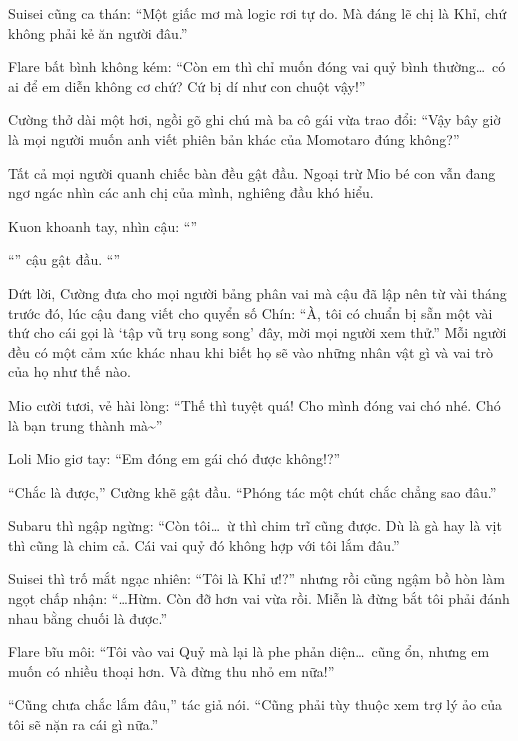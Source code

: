 \documentclass[../main.tex]{subfiles}
\begin{document}
Suisei cũng ca thán: ``Một giấc mơ mà logic rơi tự do. Mà đáng lẽ chị là Khỉ, chứ không phải kẻ ăn người đâu.''

Flare bất bình không kém: ``Còn em thì chỉ muốn đóng vai quỷ bình thường\dots\ có ai để em diễn không cơ chứ? Cứ bị dí như con chuột vậy!''

Cường thở dài một hơi, ngồi gõ ghi chú mà ba cô gái vừa trao đổi: ``Vậy bây giờ là mọi người muốn anh viết phiên bản khác của Momotaro đúng không?''

Tất cả mọi người quanh chiếc bàn đều gật đầu. Ngoại trừ Mio bé con vẫn đang ngơ ngác nhìn các anh chị của mình, nghiêng đầu khó hiểu.

Kuon khoanh tay, nhìn cậu: ``''

``'' cậu gật đầu. ``''

Dứt lời, Cường đưa cho mọi người bảng phân vai mà cậu đã lập nên từ vài tháng trước đó, lúc cậu đang viết cho quyển số Chín: ``À, tôi có chuẩn bị sẵn một vài thứ cho cái gọi là `tập vũ trụ song song' đây, mời mọi người xem thử.'' Mỗi người đều có một cảm xúc khác nhau khi biết họ sẽ vào những nhân vật gì và vai trò của họ như thế nào.

Mio cười tươi, vẻ hài lòng: ``Thế thì tuyệt quá! Cho mình đóng vai chó nhé. Chó là bạn trung thành mà\~{}''

Loli Mio giơ tay: ``Em đóng em gái chó được không!?''

``Chắc là được,'' Cường khẽ gật đầu. ``Phóng tác một chút chắc chẳng sao đâu.''

Subaru thì ngập ngừng: ``Còn tôi\dots\ ừ thì chim trĩ cũng được. Dù là gà hay là vịt thì cũng là chim cả. Cái vai quỷ đó không hợp với tôi lắm đâu.''

Suisei thì trố mắt ngạc nhiên: ``Tôi là Khỉ ư!?'' nhưng rồi cũng ngậm bồ hòn làm ngọt chấp nhận: ``\dots Hừm. Còn đỡ hơn vai vừa rồi. Miễn là đừng bắt tôi phải đánh nhau bằng chuối là được.''

Flare bĩu môi: ``Tôi vào vai Quỷ mà lại là phe phản diện\dots\ cũng ổn, nhưng em muốn có nhiều thoại hơn. Và đừng thu nhỏ em nữa!''

``Cũng chưa chắc lắm đâu,'' tác giả nói. ``Cũng phải tùy thuộc xem trợ lý ảo của tôi sẽ nặn ra cái gì nữa.''
\end{document}
